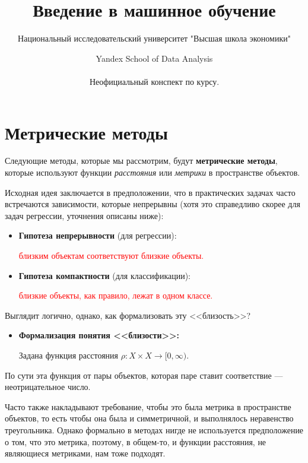 \documentclass{article}
\title{Введение в машинное обучение}
\author{Национальный исследовательский университет "Высшая школа экономики" \and Yandex School of Data Analysis\\\\
Неофициальный конспект по курсу.}
\begin{document}
\maketitle

\section{Метрические методы}

Следующие методы, которые мы рассмотрим, будут \textbf{метрические методы}, которые используют функции \textit{расстояния} или \textit{метрики} в пространстве объектов.

Исходная идея заключается в предположении, что в практических задачах часто встречаются зависимости, которые непрерывны (хотя это справедливо скорее для задач регрессии, уточнения описаны ниже):

\begin{itemize}
\item \textbf{Гипотеза непрерывности} (для регрессии):

\begin{center}
\textcolor{red}{близким объектам соответствуют близкие объекты.}
\end{center}

\item \textbf{Гипотеза компактности} (для классификации):

\begin{center}
\textcolor{red}{близкие объекты, как правило, лежат в одном классе.}
\end{center}

\end{itemize}

Выглядит логично, однако, как формализовать эту <<близость>>?

\begin{itemize}
\item \textbf{Формализация понятия <<близости>>:}

\qquad Задана функция расстояния $\rho : X \times X \rightarrow [0, \infty)$.
\end{itemize}

По сути эта функция от пары объектов, которая паре ставит соответствие — неотрицательное число.

Часто также накладывают требование, чтобы это была метрика в пространстве объектов, то есть чтобы она была и симметричной, и выполнялось неравенство треугольника. Однако формально в методах нигде не используется предположение о том, что это метрика, поэтому, в общем-то, и функции расстояния, не являющиеся метриками, нам тоже подходят.
\\
\end{document}
